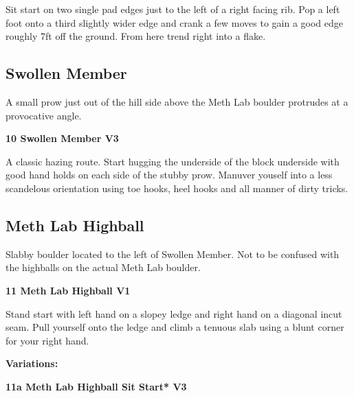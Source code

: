 \begin{multicols}{2}
					\begin{adjustwidth}{0.5cm}{}				
					Sit start on two single pad edges just to the left of a right facing rib. Pop a left foot onto a third  slightly wider edge and crank a few moves to gain a good edge roughly 7ft off the ground. From here trend right into a flake.
					\end{adjustwidth}
			\subsection*{Swollen Member}\label{bf:Swollen Member}
			A small prow just out of the hill side above the Meth Lab boulder protrudes at a provocative angle.\\
			
					\label{rt:Swollen Member}
\colorbox{green!20}{
\parbox{0.95\linewidth}{
\textbf{
10 Swollen Member V3    
}
}
}

					\begin{adjustwidth}{0.5cm}{}				
					A classic hazing route. Start hugging the underside of the block underside with good hand holds on each side of the stubby prow. Manuver youself into a less scandelous orientation using toe hooks, heel hooks and  all manner of dirty tricks.
					\end{adjustwidth}
			\subsection*{Meth Lab Highball}\label{bf:Meth Lab Highball}
			Slabby boulder located to the left of Swollen Member. Not to be confused with the highballs on the actual Meth Lab boulder.\\
			

					\label{rt:Meth Lab Highball}
\colorbox{green!20}{
\parbox{0.95\linewidth}{
\textbf{
11 Meth Lab Highball V1    \warn 
}
}
}

					\begin{adjustwidth}{0.5cm}{}				
					Stand start with left hand on a slopey ledge and right hand on a diagonal incut seam. Pull yourself onto the ledge and climb a tenuous slab using a blunt corner for your right hand.
					\end{adjustwidth}
						\begin{adjustwidth}{0.5cm}{}				
						\textbf{Variations:} \newline
							\label{vr:Meth Lab Highball Sit Start}
\colorbox{green!20}{
\parbox{0.95\linewidth}{
\textbf{
11a Meth Lab Highball Sit Start* V3   
}
}
}


\end{adjustwidth}
\end{multicols}
